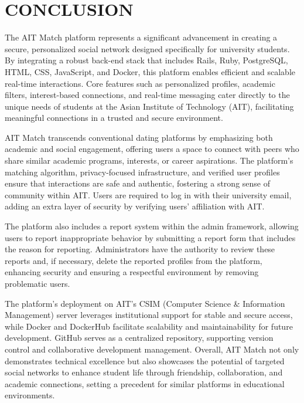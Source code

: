 \setlength{\footskip}{8mm}

\chapter{CONCLUSION}
The AIT Match platform represents a significant advancement in creating a secure, personalized social network designed specifically for university students. By integrating a robust back-end stack that includes Rails, Ruby, PostgreSQL, HTML, CSS, JavaScript, and Docker, this platform enables efficient and scalable real-time interactions. Core features such as personalized profiles, academic filters, interest-based connections, and real-time messaging cater directly to the unique needs of students at the Asian Institute of Technology (AIT), facilitating meaningful connections in a trusted and secure environment.

AIT Match transcends conventional dating platforms by emphasizing both academic and social engagement, offering users a space to connect with peers who share similar academic programs, interests, or career aspirations. The platform’s matching algorithm, privacy-focused infrastructure, and verified user profiles ensure that interactions are safe and authentic, fostering a strong sense of community within AIT. Users are required to log in with their university email, adding an extra layer of security by verifying users’ affiliation with AIT.

The platform also includes a report system within the admin framework, allowing users to report inappropriate behavior by submitting a report form that includes the reason for reporting. Administrators have the authority to review these reports and, if necessary, delete the reported profiles from the platform, enhancing security and ensuring a respectful environment by removing problematic users.

The platform’s deployment on AIT’s CSIM (Computer Science \& Information Management) server leverages institutional support for stable and secure access, while Docker and DockerHub facilitate scalability and maintainability for future development. GitHub serves as a centralized repository, supporting version control and collaborative development management. Overall, AIT Match not only demonstrates technical excellence but also showcases the potential of targeted social networks to enhance student life through friendship, collaboration, and academic connections, setting a precedent for similar platforms in educational environments.

